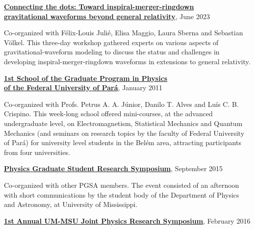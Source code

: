 \documentclass[10pt]{article}
\newcommand{\halfblankline}{\quad\vspace{-0.5\baselineskip}\pagebreak[3]}
\begin{document}
\halfblankline

\href{https://workshops.aei.mpg.de/connecting-the-dots/}
{\textbf{Connecting the dots: Toward inspiral-merger-ringdown \\ gravitational waveforms beyond general relativity}},
\hfill{June 2023}

\begin{innerlist}
    \item Co-organized with F\'elix-Louis Juli\'e, Elisa Maggio, Laura Sberna
        and Sebastian V\"olkel. This three-day workshop gathered experts on
        various aspects of gravitational-waveform modeling to discuss the
        status and challenges in developing inspiral-merger-ringdown waveforms
        in extensions to general relativity.
\end{innerlist}

\halfblankline

\href{http://www.ufpa.br/ppgf/ippgf.html}
{\textbf{1st School of the Graduate Program in Physics \\ of the Federal University of Par\'a}},
\hfill{January 2011}

\begin{innerlist}
    \item Co-organized with Profs. Petrus A. A. J\'unior,
    Danilo T. Alves and Lu\'is C. B. Crispino. This week-long school offered
    mini-courses, at the advanced undergraduate level, on Electromagnetism,
    Statistical Mechanics and Quantum Mechanics (and seminars on research
    topics by the faculty of Federal University of Par\'a) for
    university level students in the Bel\'em area, attracting participants
    from four universities.
\end{innerlist}

\halfblankline

\href{http://dos.orgsync.com/org/pgsa/ResearchSymposium2015}
{\textbf{Physics Graduate Student Research Symposium}},
\hfill{September 2015}

\begin{innerlist}
    \item Co-organized with other PGSA members. The event consisted of an afternoon
    with short communications by the student body of the Department of Physics and
    Astronomy, at University of Mississippi.
\end{innerlist}

\halfblankline

\href{http://dos.orgsync.com/org/pgsa/UM_MSU_SYMP}
{\textbf{1st Annual UM-MSU Joint Physics Research Symposium}},
\hfill{February 2016}
\end{document}
